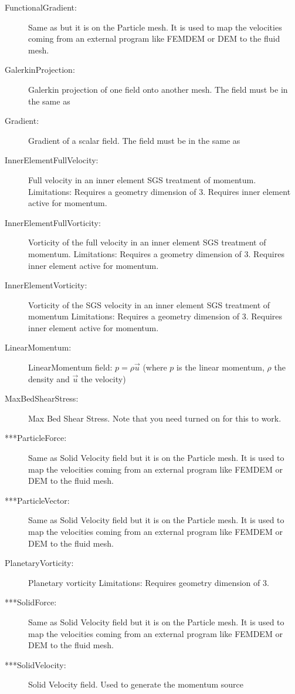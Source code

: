 \begin{description}
  \item[FunctionalGradient:]Same as  but it is on the Particle mesh. It is used to map the velocities coming from an external program like FEMDEM or DEM to the fluid mesh.    
 \item[GalerkinProjection:]Galerkin projection of one field onto another mesh. The field must be in the same  as      
 \item[Gradient:]Gradient of a scalar field. The field must be in the same  as 
 \item[InnerElementFullVelocity:]Full velocity in an inner element SGS treatment of momentum.
  Limitations: Requires a geometry dimension of 3. Requires inner element active for momentum. 
 \item[InnerElementFullVorticity:]Vorticity of the full velocity in an inner element SGS treatment of momentum.
  Limitations: Requires a geometry dimension of 3. Requires inner element active for momentum. 
 \item[InnerElementVorticity:]Vorticity of the SGS velocity in an inner element SGS treatment of momentum
  Limitations: Requires a geometry dimension of 3. Requires inner element active for momentum.
 \item[LinearMomentum:]LinearMomentum field: $p = \rho \vec{u}$ (where $p$ is the linear momentum, $\rho$ the density and $\vec{u}$ the velocity)
 \item[MaxBedShearStress:]Max Bed Shear Stress. Note that you need  turned on for this to work.    
 \item[***ParticleForce:] Same as Solid Velocity field but it is on the Particle mesh. It is used to map the velocities coming from an external program like FEMDEM or DEM to the fluid mesh.       
 \item[***ParticleVector:]Same as Solid Velocity field but it is on the Particle mesh. It is used to map the velocities coming from an external program like FEMDEM or DEM to the fluid mesh.   
 \item[PlanetaryVorticity:]Planetary vorticity
	Limitations: Requires geometry dimension of 3. 
 \item[***SolidForce:]Same as Solid Velocity field but it is on the Particle mesh. It is used to map the velocities coming from an external program like FEMDEM or DEM to the fluid mesh.    
 \item[***SolidVelocity:]Solid Velocity field.  Used to generate the momentum source   

\end{description}
